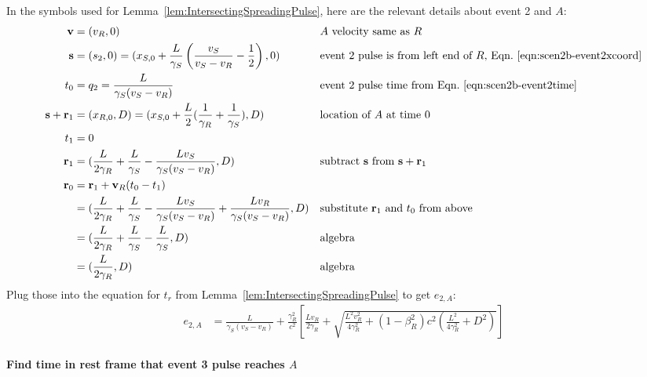 \documentclass[a4paper]{article}
\theoremstyle{plain}
\theoremstyle{definition}
\newcommand{\vect}[1]{\mathbf{#1}}
\begin{document}
In the symbols used for Lemma~\ref{lem:IntersectingSpreadingPulse},
here are the relevant details about event 2 and $A$:
\begin{align*}
\vect{v} & = (v_R, 0) & & \text{$A$ velocity same as $R$} \\
\vect{s} & = (s_2,0) = (x_{S,0} + \frac{L}{\gamma_S} \left( \frac{v_S}{v_S - v_R} - \frac{1}{2} \right), 0) & & \text{event 2 pulse is from left end of $R$, Eqn.~\eqref{eqn:scen2b-event2xcoord}} \\
t_0 & = q_2 = \frac{L}{\gamma_S(v_S - v_R)} & & \text{event 2 pulse time from Eqn.~\eqref{eqn:scen2b-event2time}} \\
\vect{s} + \vect{r}_1 & = (x_{R,0}, D) = (x_{S,0} + \frac{L}{2} ( \frac{1}{\gamma_R} + \frac{1}{\gamma_S} ), D) & & \text{location of $A$ at time 0} \\
t_1 & = 0 \\
\vect{r}_1 & = (\frac{L}{2\gamma_R} + \frac{L}{\gamma_S} - \frac{Lv_S}{\gamma_S(v_S-v_R)}, D) & & \text{subtract $\vect{s}$ from $\vect{s}+\vect{r}_1$} \\
\vect{r}_0
  & = \vect{r}_1 + \vect{v}_R(t_0-t_1) \\
  & = (\frac{L}{2\gamma_R} + \frac{L}{\gamma_S} - \frac{Lv_S}{\gamma_S(v_S-v_R)} + \frac{Lv_R}{\gamma_S(v_S - v_R)}, D) & & \text{substitute $\vect{r}_1$ and $t_0$ from above} \\
  & = (\frac{L}{2\gamma_R} + \frac{L}{\gamma_S} - \frac{L}{\gamma_S}, D) & & \text{algebra} \\
  & = (\frac{L}{2\gamma_R}, D) & & \text{algebra}
\end{align*}
Plug those into the equation for $t_r$ from
Lemma~\ref{lem:IntersectingSpreadingPulse} to get $e_{2,A}$:
\begin{align*}
e_{2,A} & = \frac{L}{\gamma_S(v_S - v_R)} + \frac{\gamma_R^2}{c^2} \left[ \frac{Lv_R}{2\gamma_R} + \sqrt{\frac{L^2v_R^2}{4\gamma_R^2} + (1-\beta_R^2)c^2 (\frac{L^2}{4\gamma_R^2} + D^2)} \right]
\end{align*}


\paragraph{Find time in rest frame that event 3 pulse reaches $A$}
\end{document}
